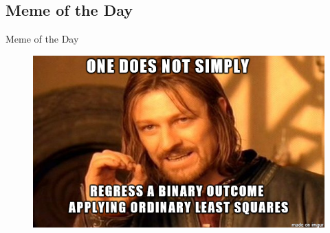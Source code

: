 \subsection{Meme of the Day}

\begin{frame}{Meme of the Day}{}
	\begin{figure}
		\includegraphics[scale=0.45]{07_logistic_regression/02_img/meme_of_the_day}
	\end{figure}
\end{frame}


\makethanks

